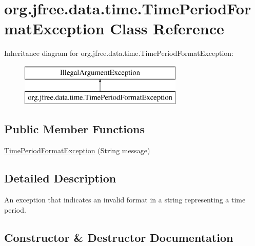 \hypertarget{classorg_1_1jfree_1_1data_1_1time_1_1_time_period_format_exception}{}\section{org.\+jfree.\+data.\+time.\+Time\+Period\+Format\+Exception Class Reference}
\label{classorg_1_1jfree_1_1data_1_1time_1_1_time_period_format_exception}
Inheritance diagram for org.\+jfree.\+data.\+time.\+Time\+Period\+Format\+Exception\+:\begin{figure}[H]
\begin{center}
\leavevmode
\includegraphics[height=2.000000cm]{classorg_1_1jfree_1_1data_1_1time_1_1_time_period_format_exception}
\end{center}
\end{figure}
\subsection*{Public Member Functions}
\begin{DoxyCompactItemize}
\item 
\mbox{\hyperlink{classorg_1_1jfree_1_1data_1_1time_1_1_time_period_format_exception_a2e6a34d2e1db33a2926cc85b5f66bb9a}{Time\+Period\+Format\+Exception}} (String message)
\end{DoxyCompactItemize}


\subsection{Detailed Description}
An exception that indicates an invalid format in a string representing a time period. 

\subsection{Constructor \& Destructor Documentation}
\mbox{\label{classorg_1_1jfree_1_1data_1_1time_1_1_time_period_format_exception_a2e6a34d2e1db33a2926cc85b5f66bb9a}} 
